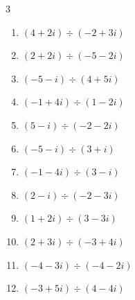 \begin{multicols}{3}
\begin{enumerate}
  \item $\displaystyle (4+2i)\div(-2+3i)$


  \item $\displaystyle (2+2i)\div(-5-2i)$


  \item $\displaystyle (-5-i)\div(4+5i)$


\columnbreak %

\resetques

  \item $\displaystyle (-1+4i)\div(1-2i)$


  \item $\displaystyle (5-i)\div(-2-2i)$


  \item $\displaystyle (-5-i)\div(3+i)$


  \item $\displaystyle (-1-4i)\div(3-i)$


  \item $\displaystyle (2-i)\div(-2-3i)$


  \item $\displaystyle (1+2i)\div(3-3i)$


  \item $\displaystyle (2+3i)\div(-3+4i)$


  \item $\displaystyle (-4-3i)\div(-4-2i)$


  \item $\displaystyle (-3+5i)\div(4-4i)$


\end{enumerate}
\end{multicols}
